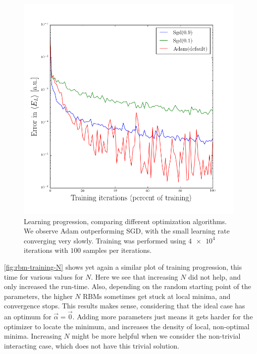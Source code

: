 \documentclass[a4paper, 11pt]{article}
\begin{document}
\begin{figure}[ht]
    \centering
    \includegraphics[width=0.8\linewidth]{../results/learning-optimizers.png}
    \caption{Learning progression, comparing different optimization algorithms.
    We observe Adam outperforming SGD, with the small learning rate converging
    very slowly. Training was performed using $\num{4e4}$ iterations with $100$
    samples per iterations.}
    \label{fig:rbm-training-optimizers}
\end{figure}


\begin{multicols}{2}

    \autoref{fig:rbm-training-N} shows yet again a similar plot of training
    progression, this time for various values for $N$. Here we see that
    increasing $N$ did not help, and only increased the run-time. Also,
    depending on the random starting point of the parameters, the higher $N$
    RBMs sometimes get stuck at local minima, and convergence stops. This
    results makes sense, considering that the ideal case has an optimum for
    $\vec \alpha=\vec 0$. Adding more parameters just means it gets harder for
    the optimizer to locate the minimum, and increases the density of local,
    non-optimal minima. Increasing $N$ might be more helpful when we
    consider the non-trivial interacting case, which does not have this trivial
    solution.


\end{multicols}
\end{document}
